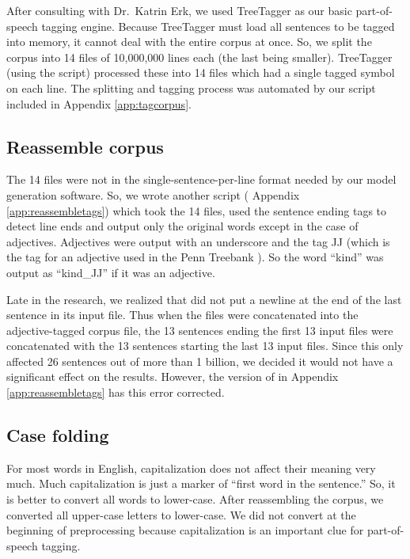 \documentclass[eric_thesis.tex]{subfiles}
\begin{document}
After consulting with Dr.\ Katrin Erk,  we used TreeTagger  as our basic part-of-speech 
tagging engine. Because TreeTagger must load all sentences to be tagged into 
memory, it cannot deal with the entire corpus at once. So, we split the corpus 
into 14 files of 10,000,000 lines each (the last being smaller). TreeTagger 
(using the  script) processed these into 14 
files which had a single tagged symbol on each line. The splitting and tagging 
process was automated by our  script included in 
Appendix \ref{app:tagcorpus}.

\subsection{Reassemble corpus}

The 14 files were not in the single-sentence-per-line format needed by our model 
generation software. So, we wrote another script ( 
Appendix \ref{app:reassembletags}) which took the 14 files, used the sentence 
ending tags to detect line ends and output only the original words except in the 
case of adjectives. Adjectives were output with an underscore and the tag JJ 
(which is the tag for an adjective used in the Penn Treebank ). So 
the word ``kind'' was output as ``kind\_JJ'' if it was an adjective.

Late in the research, we realized that  did not 
put a newline at the end of the last sentence in its input file. Thus when the 
files were concatenated into the adjective-tagged corpus file, the 13 sentences 
ending the first 13 input files were concatenated with the 13 sentences starting 
the last 13 input files. Since this only affected 26 sentences out of more than 
1 billion, we decided it would not have a significant effect on the results. 
However, the version of  in Appendix 
\ref{app:reassembletags} has this error corrected.

\subsection{Case folding}

For most words in English, capitalization does not affect their meaning very 
much. Much capitalization is just a marker of ``first word in the sentence.'' 
So, it is better to convert all words to lower-case. After reassembling the 
corpus, we converted all upper-case letters to lower-case. We did not convert at 
the beginning of preprocessing because capitalization is an important clue for 
part-of-speech tagging.
\end{document}
